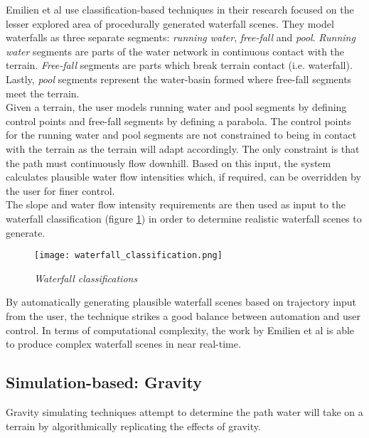 Emilien et al \cite{Emilien2014} use classification-based techniques in their research focused on the lesser explored area of procedurally generated waterfall scenes. They model waterfalls as three separate segments: \textit{running water}, \textit{free-fall} and \textit{pool}. \textit{Running water} segments are parts of the water network in continuous contact with the terrain. \textit{Free-fall} segments are parts which break terrain contact (i.e. waterfall). Lastly, \textit{pool} segments represent the water-basin formed where free-fall segments meet the terrain. \\
Given a terrain, the user models running water and pool segments by defining control points and free-fall segments by defining a parabola. The control points for the running water and pool segments are not constrained to being in contact with the terrain as the terrain will adapt accordingly. The only constraint is that the path must continuously flow downhill. Based on this input, the system calculates plausible water flow intensities which, if required, can be overridden by the user for finer control.\\
The slope and water flow intensity requirements are then used as input to the waterfall classification (figure \ref{fig:waterfall_classification}) in order to determine realistic waterfall scenes to generate.\\

\begin{figure}[h]
  \centering
	\texttt{[image: waterfall\_classification.png]}
	\caption{\textit{Waterfall classifications \cite{Emilien2014}}}
	\label{fig:waterfall_classification}
\end{figure}

By automatically generating plausible waterfall scenes based on trajectory input from the user, the technique strikes a good balance between automation and user control. In terms of computational complexity, the work by Emilien et al \cite{Emilien2014} is able to produce complex waterfall scenes in near real-time.

\subsection{Simulation-based: Gravity} \label{subsec:gravitation}

Gravity simulating techniques attempt to determine the path water will take on a terrain by algorithmically replicating the effects of gravity. \\

